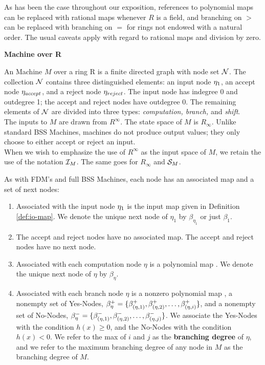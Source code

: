 As has been the case throughout our exposition, references to
polynomial maps can be replaced with rational maps whenever $R$ is a
field, and branching on $>$ can be replaced with branching on $=$ for
rings not endowed with a natural order.  The usual caveats apply with
regard to rational maps and division by zero.\\

\begin{definition} \textbf{\ndet Machine over R}

  An \ndet Machine $M$ over a ring R is a finite directed graph with
  node set $\mathcal{N}$.  The collection $\mathcal{N}$ contains three
  distinguished elements: an input node $\eta_{1}$, an accept node
  $\eta_{accept}$, and a reject node $\eta_{reject}$.  The input node has indegree
  0 and outdegree 1; the accept and reject nodes have outdegree 0.
  The remaining elements of $\mathcal{N}$ are divided into three types:
  \emph{computation, branch,} and \emph{shift}.\\

  The inputs to $M$ are drawn from $R^\infty$.  The state space of $M$
  is $R_\infty$. Unlike standard BSS Machines, \ndet machines do not
  produce output values; they only choose to either accept or reject
  an input.\\

  When we wish to emphasize the use of $R^\infty$ as the input space
  of $M$, we retain the use of the notation $\mathcal{I}_M$. The same
  goes for $R_\infty$ and $\mathcal{S}_M$.

  As with FDM's and full BSS Machines, each node has an associated map
  and a set of next nodes:

  \begin{enumerate}
  \item Associated with the input node $\eta_{1}$ is the input map
     given in Definition
    \ref{def:io-map}. We denote the unique next node of $\eta_1$ by
    $\beta_{\eta_1}$ or just $\beta_1$.

  \item The accept and reject nodes have no associated map. The accept
    and reject nodes have no next node.

  \item Associated with each computation node $\eta$ is a polynomial
    map . We denote the
    unique next node of $\eta$ by $\beta_\eta$.
    
  \item Associated with each branch node $\eta$ is a nonzero
    polynomial map , a
    nonempty set of Yes-Nodes, $\beta^+_\eta = \{\beta_{(\eta, 1)}^+,
      \beta_{(\eta, 2)}^+, \ldots, \beta_{(\eta, i)}^+\}$, and a nonempty set of
    No-Nodes, $\beta_\eta^- = \{\beta_{(\eta, 1)}^-, \beta_{(\eta, 2)}^-, \ldots,
      \beta_{(\eta, j)}^-\}$.  We associate the Yes-Nodes with the condition
    $h(x) \geq 0$, and the No-Nodes with the condition $h(x) < 0$. We
    refer to the max of $i$ and $j$ as the \textbf{branching degree}
    of $\eta$, and we refer to the maximum branching degree of any
    node in $M$ as the branching degree of $M$.


\end{enumerate}
\end{definition}
